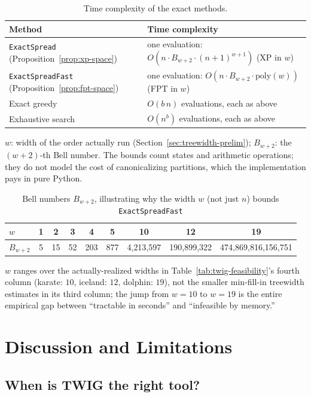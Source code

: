 \documentclass[11pt]{article}
\theoremstyle{definition}
\theoremstyle{remark}
\newcommand{\up}{\rule{0pt}{2.6ex}}
\newcommand{\down}{\rule[-1.2ex]{0pt}{0pt}}
\begin{document}
\begin{table}[h]
\centering
\caption{Time complexity of the exact methods.}\label{tab:complexity}
\small
\begin{tabular}{@{}ll@{}}
\hline
\up Method & Time complexity \\
\hline
\up \texttt{ExactSpread} (Proposition~\ref{prop:xp-space}) & one evaluation: $O(n\cdot B_{w+2}\cdot(n+1)^{w+1})$ (XP in $w$) \\
\texttt{ExactSpreadFast} (Proposition~\ref{prop:fpt-space}) & one evaluation: $O(n\cdot B_{w+2}\cdot\mathrm{poly}(w))$ (FPT in $w$) \\
Exact greedy & $O(b\,n)$ evaluations, each as above \\
\down Exhaustive search & $O(n^b)$ evaluations, each as above \\
\hline
\end{tabular}

\smallskip
{\footnotesize $w$: width of the order actually run (Section~\ref{sec:treewidth-prelim}); $B_{w+2}$: the $(w+2)$-th Bell number. The bounds count states and arithmetic operations; they do not model the cost of canonicalizing partitions, which the implementation pays in pure Python.}
\end{table}

\begin{table}[h]
\centering
\caption{Bell numbers $B_{w+2}$, illustrating why the width $w$ (not just $n$) bounds \texttt{ExactSpreadFast}\label{tab:bell-numbers}}
\begin{tabular}{@{}lcccccccc@{}}
\hline
\up $w$ & 1 & 2 & 3 & 4 & 5 & 10 & 12 & 19 \\
\hline
\down $B_{w+2}$ & 5 & 15 & 52 & 203 & 877 & 4{,}213{,}597 & 190{,}899{,}322 & 474{,}869{,}816{,}156{,}751 \\
\hline
\end{tabular}
{\footnotesize $w$ ranges over the actually-realized widths in
Table~\ref{tab:twig-feasibility}'s fourth column (karate: $10$, iceland:
$12$, dolphin: $19$), not the smaller min-fill-in treewidth estimates in
its third column; the jump from $w=10$ to $w=19$ is the entire empirical
gap between ``tractable in seconds'' and ``infeasible by memory.''}
\end{table}
\section{Discussion and Limitations}\label{sec:discussion}

\subsection{When is TWIG the right tool?}\label{sec:discussion-twig}
\end{document}
